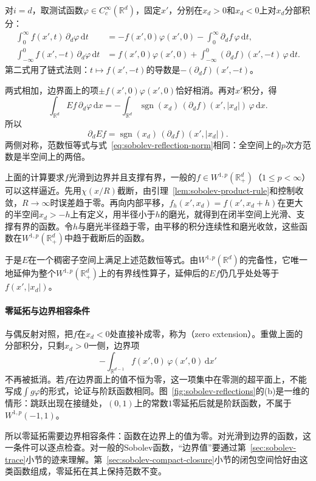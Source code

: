 对$i=d$，取测试函数$\varphi\in C_c^\infty(\mathbb R^d)$，固定$x'$，分别在$x_d>0$和$x_d<0$上对$x_d$分部积分：
\[
\begin{aligned}
\int_0^\infty f(x',t)\,\partial_d\varphi\,\mathrm dt
&=-f(x',0)\varphi(x',0)-\int_0^\infty\partial_df\,\varphi\,\mathrm dt,\\
\int_{-\infty}^0 f(x',-t)\,\partial_d\varphi\,\mathrm dt
&=f(x',0)\varphi(x',0)+\int_{-\infty}^0(\partial_df)(x',-t)\,\varphi\,\mathrm dt .
\end{aligned}
\]
第二式用了链式法则：$t\mapsto f(x',-t)$的导数是$-(\partial_df)(x',-t)$。

两式相加，边界面上的项$\pm f(x',0)\varphi(x',0)$恰好相消。再对$x'$积分，得
\[
\int_{\mathbb R^d}Ef\,\partial_d\varphi\,\mathrm dx
=-\int_{\mathbb R^d}\operatorname{sgn}(x_d)\,(\partial_df)(x',|x_d|)\,\varphi\,\mathrm dx .
\]
所以
\[
\partial_dEf=\operatorname{sgn}(x_d)\,(\partial_df)(x',|x_d|).
\]
两侧对称，范数恒等式与式~\eqref{eq:sobolev-reflection-norm}相同：全空间上的$p$次方范数是半空间上的两倍。

上面的计算要求$f$光滑到边界并且支撑有界，一般的$f\in W^{1,p}(\mathbb R^d_+)$（$1\leq p<\infty$）可以这样逼近。先用$\chi(x/R)$截断，由引理~\ref{lem:sobolev-product-rule}和控制收敛，$R\to\infty$时误差趋于零。再向内部平移，$f_h(x',x_d)=f(x',x_d+h)$在更大的半空间$x_d>-h$上有定义，用半径小于$h$的磨光，就得到在闭半空间上光滑、支撑有界的函数。令$h$与磨光半径趋于零，由平移的积分连续性和磨光收敛，这些函数在$W^{1,p}(\mathbb R^d_+)$中趋于截断后的函数。

于是$E$在一个稠密子空间上满足上述范数恒等式。由$W^{1,p}(\mathbb R^d)$的完备性，它唯一地延伸为整个$W^{1,p}(\mathbb R^d_+)$上的有界线性算子，延伸后的$Ef$仍几乎处处等于$f(x',|x_d|)$。

\paragraph{零延拓与边界相容条件}
与偶反射对照，把$f$在$x_d<0$处直接补成零，称为（zero extension）。重做上面的分部积分，只剩$x_d>0$一侧，边界项
\[
-\int_{\mathbb R^{d-1}}f(x',0)\,\varphi(x',0)\,\mathrm dx'
\]
不再被抵消。若$f$在边界面上的值不恒为零，这一项集中在零测的超平面上，不能写成$\int g\varphi$的形式，论证与阶跃函数相同。图~\ref{fig:sobolev-reflections}的(b)是一维的情形：跳跃出现在接缝处，$(0,1)$上的常数$1$零延拓后就是阶跃函数，不属于$W^{1,p}(-1,1)$。

所以零延拓需要边界相容条件：函数在边界上的值为零。对光滑到边界的函数，这一条件可以逐点检查。对一般的Sobolev函数，“边界值”要通过第~\ref{sec:sobolev-trace}小节的迹来理解。第~\ref{sec:sobolev-compact-closure}小节的闭包空间恰好由这类函数组成，零延拓在其上保持范数不变。

